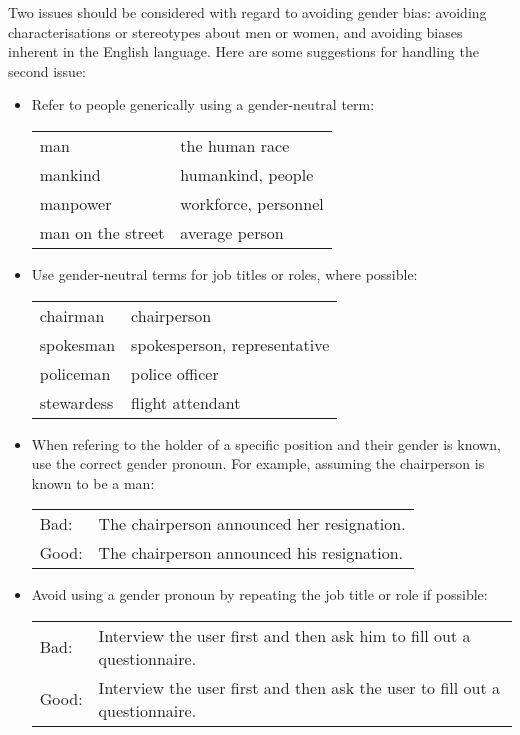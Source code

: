 Two issues should be considered with regard to avoiding gender bias:
avoiding characterisations or stereotypes about men or women,
and avoiding biases inherent in the English language.
Here are some suggestions for handling the second issue:
\begin{itemize}

\item Refer to people generically using a gender-neutral term:

\begin{tabular}{ll}
   man                 &   the human race        \\
   mankind             &   humankind, people     \\
   manpower            &   workforce, personnel  \\
   man on the street   &   average person        \\
\end{tabular}



\item Use gender-neutral terms for job titles or roles, where
  possible:

\begin{tabular}{ll}
  chairman     &  chairperson \\
  spokesman    &  spokesperson, representative \\
  policeman    &  police officer \\
  stewardess   &  flight attendant \\
\end{tabular}



\item When refering to the holder of a specific position and their
  gender is known, use the correct gender pronoun. For example,
  assuming the chairperson is known to be a man:

\begin{tabular}{lp{0.9\hsize}}
Bad:  & The chairperson announced her resignation. \\
Good: & The chairperson announced his resignation. \\
\end{tabular}



\item Avoid using a gender pronoun by repeating the job title or role
  if possible:

\begin{tabular}{lp{0.9\hsize}}
Bad: &
Interview the user first and then ask him to fill out a questionnaire. \\
%
Good: &
Interview the user first and then ask the user to fill out a questionnaire. \\
\end{tabular}




\end{itemize}
